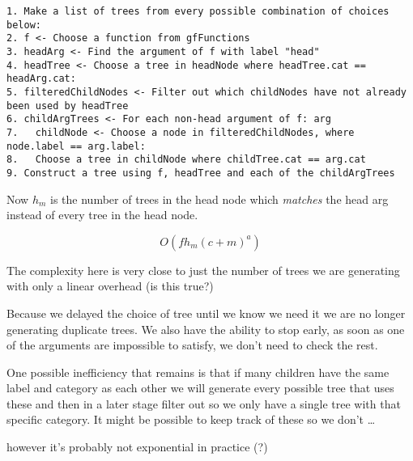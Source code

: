 \begin{verbatim}
1. Make a list of trees from every possible combination of choices below:
2. f <- Choose a function from gfFunctions
3. headArg <- Find the argument of f with label "head"
4. headTree <- Choose a tree in headNode where headTree.cat == headArg.cat:
5. filteredChildNodes <- Filter out which childNodes have not already been used by headTree
6. childArgTrees <- For each non-head argument of f: arg
7.   childNode <- Choose a node in filteredChildNodes, where node.label == arg.label:
8.   Choose a tree in childNode where childTree.cat == arg.cat
9. Construct a tree using f, headTree and each of the childArgTrees
\end{verbatim}

Now $h_m$ is the number of trees in the head node which \emph{matches} the head arg instead of every tree in the head node.

$$
O(f h_m (c+m)^a)
$$

The complexity here is very close to just the number of trees we are generating with only a linear overhead (is this true?)

Because we delayed the choice of tree until we know we need it we are no longer generating duplicate trees.
We also have the ability to stop early, as soon as one of the arguments are impossible to satisfy, we don't need to check the rest.

One possible inefficiency that remains is that if many children have the same label and category as each other we will
generate every possible tree that uses these and then in a later stage filter out so we only have a single tree with that specific category. It might be possible to keep track of these so we don't \dots

however it's probably not exponential in practice (?)


